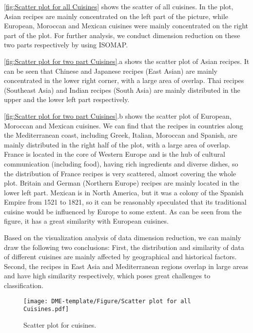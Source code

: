 \documentclass{article}
\begin{document}
\autoref{fig:Scatter plot for all Cuisines} shows the scatter of all cuisines. In the plot, Asian recipes are mainly concentrated on the left part of the picture, while European, Moroccan and Mexican cuisines were mainly concentrated on the right part of the plot. For further analysis, we conduct dimension reduction on these two parts respectively by using ISOMAP.

\autoref{fig:Scatter plot for two part Cuisines}.a shows the scatter plot of Asian recipes. It can be seen that Chinese and Japanese recipes (East Asian) are mainly concentrated in the lower right corner, with a large area of overlap. Thai recipes (Southeast Asia) and Indian recipes (South Asia) are mainly distributed in the upper and the lower left part respectively.

\autoref{fig:Scatter plot for two part Cuisines}.b shows the scatter plot of European, Moroccan and Mexican cuisines. We can find that the recipes in countries along the Mediterranean coast, including Greek, Italian, Moroccan and Spanish, are mainly distributed in the right half of the plot, with a large area of overlap. France is located in the core of Western Europe and is the hub of cultural communication (including food), having rich ingredients and diverse dishes, so the distribution of France recipes is very scattered, almost covering the whole plot. Britain and German (Northern Europe) recipes are mainly located in the lower left part. Mexican is in North America, but it was a colony of the Spanish Empire from 1521 to 1821, so it can be reasonably speculated that its traditional cuisine would be influenced by Europe to some extent. As can be seen from the figure, it has a great similarity with European cuisines.

Based on the visualization analysis of data dimension reduction, we can mainly draw the following two conclusions:
First, the distribution and similarity of data of different cuisines are mainly affected by geographical and historical factors. Second, the recipes in East Asia and Mediterranean regions overlap in large areas and have high similarity respectively, which poses great challenges to classification.

\begin{figure}[ht]
\vskip -5mm
\centering
\texttt{[image: DME-template/Figure/Scatter plot for all Cuisines.pdf]}
\vskip -3mm
\caption{Scatter plot for cuisines.}
\label{fig:Scatter plot for all Cuisines} 
\vskip -3mm
\end{figure}
\end{document}
